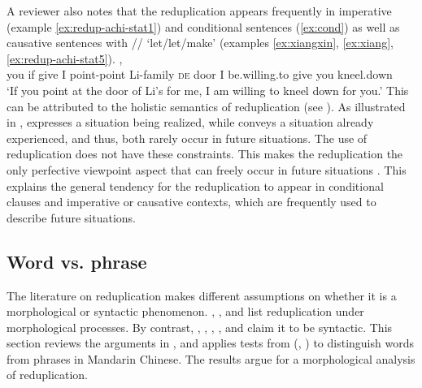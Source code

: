 A reviewer also notes that the reduplication appears frequently in imperative (example \ref{ex:redup-achi-stat1}) and conditional sentences (\ref{ex:cond}) as well as causative sentences with \slash{}\slash{} `let/let/make' (examples \ref{ex:xiangxin}, \ref{ex:xiang}, \ref{ex:redup-achi-stat5}).
\ea\label{ex:cond}
\gll {}       ,     \\
you if give I point-point Li-family \textsc{de} door I be.willing.to give you kneel.down\\
\glt `If you point at the door of Li's for me, I am willing to kneel down for you.'
\z
This can  be attributed to the holistic semantics of reduplication (see ).
As illustrated in ,  expresses a situation being realized,
while  conveys a situation already experienced,
and thus, both rarely occur in future situations.
The use of reduplication does not have these constraints.
This makes the reduplication the only perfective viewpoint aspect that can freely occur in future situations \citep[156--157]{XiaoMcEnery2004}.
This explains the general tendency for the reduplication to appear in conditional clauses and imperative or causative contexts,
which are frequently used to describe future situations.




\subsection{Word vs. phrase}\label{sec:word}

The literature on reduplication makes different assumptions on whether it is a morphological or syntactic phenomenon.
\citet[Ch. 4]{Chao1968}, \citet[Ch. 3]{LiThompson1981}, \citet[Sec. 4.1]{Dai1992} and \citet[4--5]{Liao2014} list reduplication under morphological processes. 
By contrast, \citet[23]{Arcodiaetal2014}, \citet{Xiong2016}, \citet[146]{BascianoMelloni2017}, \citet[229--231]{YangWei2017}, \citet[330]{MelloniBasciano2018} and \citet{Xie2020}  claim it to be syntactic.
This section reviews the arguments in \citet{Xie2020},
and applies tests from \citeauthor{Dai1992} (\citeyear[Sec. 7]{Dai1992}, \citeyear[Sec. 2.3--2.4]{Dai1998}) to distinguish words from phrases in Mandarin Chinese.
The results argue for a morphological analysis of reduplication.



